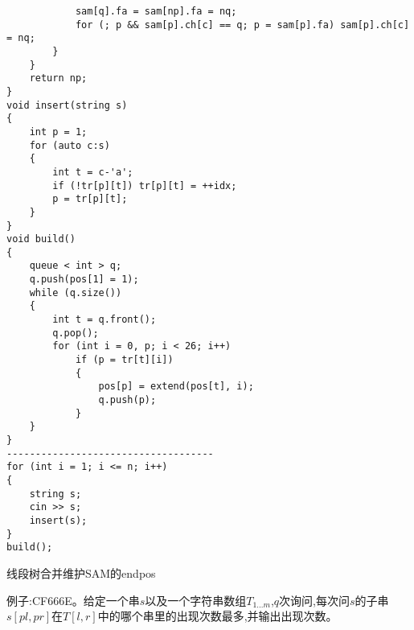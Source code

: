 \documentclass[a4paper,fontset=none]{ctexart}
\begin{document}
\begin{verbatim}
            sam[q].fa = sam[np].fa = nq;
            for (; p && sam[p].ch[c] == q; p = sam[p].fa) sam[p].ch[c] = nq;
        }
    }
    return np;
}
void insert(string s)
{
    int p = 1;
    for (auto c:s)
    {
        int t = c-'a';
        if (!tr[p][t]) tr[p][t] = ++idx;
        p = tr[p][t];
    }
}
void build()
{
    queue < int > q;
    q.push(pos[1] = 1);
    while (q.size())
    {
        int t = q.front();
        q.pop();
        for (int i = 0, p; i < 26; i++)
            if (p = tr[t][i])
            {
                pos[p] = extend(pos[t], i);
                q.push(p);
            }
    }
}
------------------------------------
for (int i = 1; i <= n; i++)
{
    string s;
    cin >> s;
    insert(s);
}
build();
\end{verbatim}

线段树合并维护SAM的endpos

例子:CF666E。给定一个串$s$以及一个字符串数组$T_{1...m}$,$q$次询问,每次问$s$的子串$s[pl,pr]$在$T[l,r]$中的哪个串里的出现次数最多,并输出出现次数。
\end{document}
